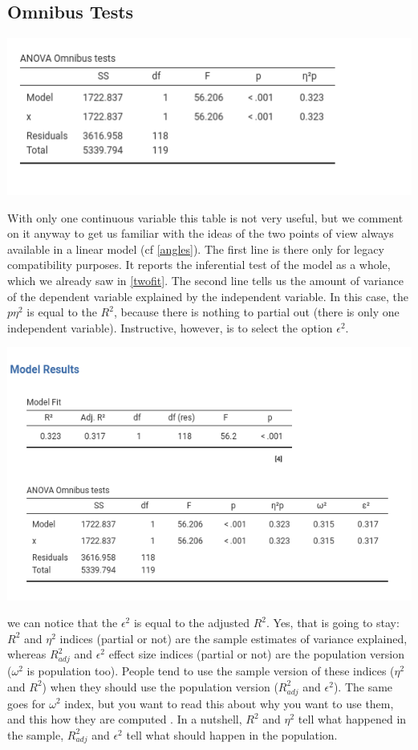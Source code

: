 \documentclass[
]{book}
\begin{document}
\hypertarget{omnibus-tests}{%
\subsection{Omnibus Tests}\label{omnibus-tests}}

\includegraphics[width=0.9\linewidth]{bookletpics/2_output3}

With only one continuous variable this table is not very useful, but we comment on it anyway to get us familiar with the ideas of the two points of view always available in a linear model (cf \ref{angles}). The first line is there only for legacy compatibility purposes. It reports the inferential test of the model as a whole, which we already saw in \ref{twofit}. The second line tells us the amount of variance of the dependent variable explained by the independent variable. In this case, the \(p\eta^2\) is equal to the \(R^2\), because there is nothing to partial out (there is only one independent variable). Instructive, however, is to select the option \(\epsilon^2\).

\includegraphics[width=0.9\linewidth]{bookletpics/2_output4}

we can notice that the \(\epsilon^2\) is equal to the adjusted \(R^2\). Yes, that is going to stay: \(R^2\) and \(\eta^2\) indices (partial or not) are the sample estimates of variance explained, whereas \(R_{adj}^2\) and \(\epsilon^2\) effect size indices (partial or not) are the population version (\(\omega^2\) is population too). People tend to use the sample version of these indices (\(\eta^2\) and \(R^2\)) when they should use the population version (\(R^2_{adj}\) and \(\epsilon^2\)). The same goes for \(\omega^2\) index, but you want to read this about why you want to use them, and this how they are computed . In a nutshell, \(R^2\) and \(\eta^2\) tell what happened in the sample, \(R_{adj}^2\) and \(\epsilon^2\) tell what should happen in the population.
\end{document}
